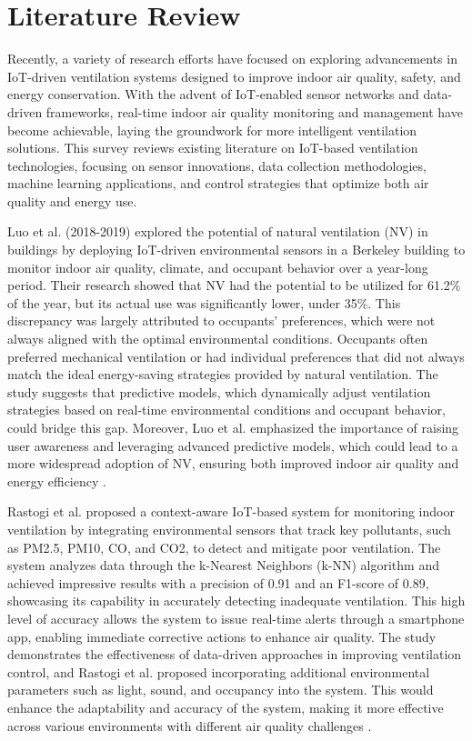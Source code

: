 \section{Literature Review}  
Recently, a variety of research efforts have focused on exploring advancements in IoT-driven ventilation systems designed to improve indoor air quality, safety, and energy conservation. With the advent of IoT-enabled sensor networks and data-driven frameworks, real-time indoor air quality monitoring and management have become achievable, laying the groundwork for more intelligent ventilation solutions. This survey reviews existing literature on IoT-based ventilation technologies, focusing on sensor innovations, data collection methodologies, machine learning applications, and control strategies that optimize both air quality and energy use.

Luo et al. (2018-2019) explored the potential of natural ventilation (NV) in buildings by deploying IoT-driven environmental sensors in a Berkeley building to monitor indoor air quality, climate, and occupant behavior over a year-long period. Their research showed that NV had the potential to be utilized for 61.2\% of the year, but its actual use was significantly lower, under 35\%. This discrepancy was largely attributed to occupants' preferences, which were not always aligned with the optimal environmental conditions. Occupants often preferred mechanical ventilation or had individual preferences that did not always match the ideal energy-saving strategies provided by natural ventilation. The study suggests that predictive models, which dynamically adjust ventilation strategies based on real-time environmental conditions and occupant behavior, could bridge this gap. Moreover, Luo et al. emphasized the importance of raising user awareness and leveraging advanced predictive models, which could lead to a more widespread adoption of NV, ensuring both improved indoor air quality and energy efficiency \cite{1}.

Rastogi et al. proposed a context-aware IoT-based system for monitoring indoor ventilation by integrating environmental sensors that track key pollutants, such as PM2.5, PM10, CO, and CO2, to detect and mitigate poor ventilation. The system analyzes data through the k-Nearest Neighbors (k-NN) algorithm and achieved impressive results with a precision of 0.91 and an F1-score of 0.89, showcasing its capability in accurately detecting inadequate ventilation. This high level of accuracy allows the system to issue real-time alerts through a smartphone app, enabling immediate corrective actions to enhance air quality. The study demonstrates the effectiveness of data-driven approaches in improving ventilation control, and Rastogi et al. proposed incorporating additional environmental parameters such as light, sound, and occupancy into the system. This would enhance the adaptability and accuracy of the system, making it more effective across various environments with different air quality challenges \cite{2}.

